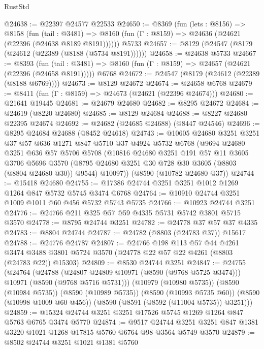\begin{lexlean}{RustStd}
\begin{coremodule}
@24638 := @22397 @24577 @22533
@24650 := @8369
    (fun (lets : @8156) =>
    @8158
      (fun (tail : @3481) =>
      @8160 (fun (Γ : @8159) => @24636 (@24621 (@22396 (@24638 @8189 @8191))))))
    @5733
@24657 := @8129 (@24547 (@8179 (@24612 (@22389 (@8188 (@5734 @8191))))))
@24658 := @24638 @5733
@24667 := @8393
    (fun (tail : @3481) => @8160 (fun (Γ : @8159) => @24657 (@24621 (@22396 (@24658 @8191)))))
    @6768
@24672 := @24547 (@8179 (@24612 (@22389 (@8188 @6769))))
@24673 := @8129 @24672
@24674 := @24658 @6768
@24679 := @8411 (fun (Γ : @8159) => @24673 (@24621 (@22396 @24674)))
@24680 := @21641 @19445
@24681 := @24679 @24680
@24682 := @8295 @24672
@24684 := @24619 (@8220 @24680)
@24685 := @8129 @24684
@24688 := @8227 @24680 @22395 @24674
@24692 := @24682 (@24685 @24688) (@8447 @24546)
@24696 := @8295 @24684 @24688 (@8452 @24618)
@24743 := @10605
    @24680
    @3251
    @3251
    @37
    @57
    @636
    @1271
    @847
    @5710
    @37
    @4924
    @5732
    @6768
    (@9694
      @24680
      @3251
      @636
      @57
      @5706
      @5708
      (@10816
        @24680
        @3251
        @191
        @57
        @11
        @3605
        @3706
        @5696
        @3570
        (@8795 @24680 @3251 @30 @728 @30 @3605 (@8803 (@8804 @24680 @30)) @9544)
        @10097))
    (@8590 (@10782 @24680 @37))
@24744 := @15418 @24680
@24755 := @17386 @24744 @3251 @3251 @1012 @1269 @1264 @847 @5732 @5745 @3474 @6768
@24764 := @10910 @24744 @3251 @1009 @1011 @60 @456 @5732 @5743 @5735
@24766 := @10923 @24744 @3251
@24776 := @24766 @211 @325 @57 @59 @4335 @5731 @5742 @3801 @5715 @3570
@24778 := @8795 @24744 @3251
@24782 := @24778 @37 @57 @37 @4335
@24783 := @8804 @24744
@24787 := @24782 (@8803 (@24783 @37)) @15617
@24788 := @24776 @24787
@24807 := @24766
    @198
    @113
    @57
    @44
    @4261
    @3474
    @3488
    @3801
    @5724
    @3570
    (@24778 @22 @57 @22 @4261 (@8803 (@24783 @22)) @15303)
@24809 := @8530 @24744 @3251
@24847 := @24755
    (@24764
      (@24788 (@24807 @24809 @10971 (@8590 (@9768 @5725 @3474))) @10971 (@8590 (@9768 @5716 @5731)))
      (@10979 (@10980 @5735))
      (@8590 (@10984 @5735))
      (@8590 (@10989 @5735))
      (@8590 (@10993 @5735 @60))
      (@8590 (@10998 @1009 @60 @456))
      (@8590 (@8591 (@8592 (@11004 @5735)) @3251)))
@24859 := @15324 @24744 @3251 @3251 @17526 @5745 @1269 @1264 @847 @5763 @6765 @3474 @5770
@24874 := @9517
    @24744
    @3251
    @3251
    @847
    @1381
    @3220
    @1021
    @1268
    @17815
    @5760
    @6764
    @98
    @3564
    @5749
    @3570
@24879 := @8502 @24744 @3251 @1021 @1381 @5760

\end{coremodule}
\end{lexlean}
